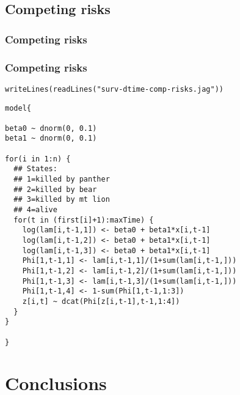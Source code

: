 \documentclass[color=usenames,dvipsnames]{beamer}\usepackage[]{graphicx}\usepackage[]{color}
\makeatletter
\newcommand{\hlstr}[1]{\textcolor[rgb]{0.749,0.012,0.012}{#1}}%
\newcommand{\hlstd}[1]{\textcolor[rgb]{0,0,0}{#1}}%
\newcommand{\hlkwd}[1]{\textcolor[rgb]{0.004,0.004,0.506}{#1}}%
\newenvironment{kframe}{%
 \def\at@end@of@kframe{}%
 \ifinner\ifhmode%
  \def\at@end@of@kframe{\end{minipage}}%
  \begin{minipage}{\columnwidth}%
 \fi\fi%
 \def\FrameCommand##1{\hskip\@totalleftmargin \hskip-\fboxsep
 \colorbox{shadecolor}{##1}\hskip-\fboxsep
     \hskip-\linewidth \hskip-\@totalleftmargin \hskip\columnwidth}%
 \MakeFramed {\advance\hsize-\width
   \@totalleftmargin\z@ \linewidth\hsize
   \@setminipage}}%
 {\par\unskip\endMakeFramed%
 \at@end@of@kframe}
\newenvironment{knitrout}{}{} %
\makeatother
\begin{document}
\subsection{Competing risks}


\begin{frame}
  \frametitle{Competing risks}
  
\end{frame}




\begin{frame}[fragile]
  \frametitle{Competing risks}
\begin{knitrout}\scriptsize
{}\color{fgcolor}\begin{kframe}
\begin{alltt}
\hlkwd{writeLines}\hlstd{(}\hlkwd{readLines}\hlstd{(}\hlstr{"surv-dtime-comp-risks.jag"}\hlstd{))}
\end{alltt}
\end{kframe}
\end{knitrout}
\begin{knitrout}\scriptsize
{}\color{fgcolor}\begin{kframe}
\begin{verbatim}
model{

beta0 ~ dnorm(0, 0.1)
beta1 ~ dnorm(0, 0.1)

for(i in 1:n) {
  ## States:
  ## 1=killed by panther
  ## 2=killed by bear
  ## 3=killed by mt lion
  ## 4=alive
  for(t in (first[i]+1):maxTime) {
    log(lam[i,t-1,1]) <- beta0 + beta1*x[i,t-1]
    log(lam[i,t-1,2]) <- beta0 + beta1*x[i,t-1]
    log(lam[i,t-1,3]) <- beta0 + beta1*x[i,t-1]
    Phi[1,t-1,1] <- lam[i,t-1,1]/(1+sum(lam[i,t-1,]))
    Phi[1,t-1,2] <- lam[i,t-1,2]/(1+sum(lam[i,t-1,]))
    Phi[1,t-1,3] <- lam[i,t-1,3]/(1+sum(lam[i,t-1,]))
    Phi[1,t-1,4] <- 1-sum(Phi[1,t-1,1:3])
    z[i,t] ~ dcat(Phi[z[i,t-1],t-1,1:4])
  }
}

}
\end{verbatim}
\end{kframe}
\end{knitrout}
\end{frame}



\section{Conclusions}
\end{document}
